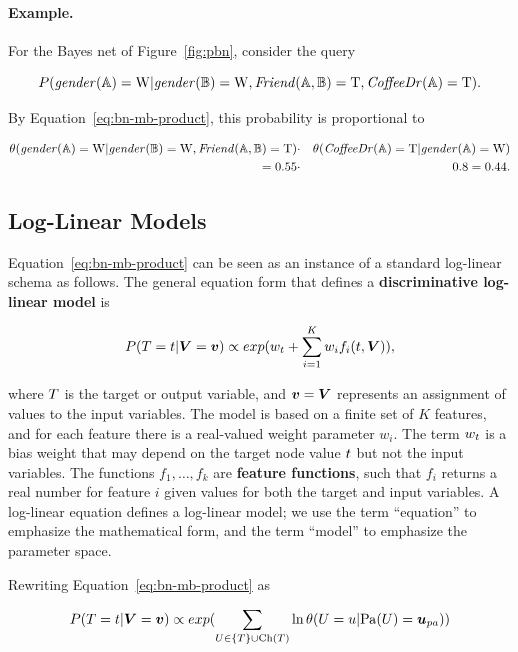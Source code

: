 \documentclass[runningheads,a4paper]{llncs}
\newcommand{\strongpoint}[1]{\paragraph{#1.}}
\begin{document}
\strongpoint{Example} For the Bayes net of Figure~\ref{fig:pbn}, consider the query

$$P(\it{gender}(\mathbb{A}) = \mathrm{W} | \it{gender}(\mathbb{B}) = \mathrm{W}, \it{Friend}(\mathbb{A},\mathbb{B}) = \mathrm{T}, \it{CoffeeDr}(\mathbb{A}) = \mathrm{T}).$$

\noindent By Equation~\ref{eq:bn-mb-product}, this probability is proportional to 

\begin{eqnarray*}
\theta(\it{gender}(\mathbb{A}) = \mathrm{W}|\it{gender}(\mathbb{B}) = \mathrm{W}, \it{Friend}(\mathbb{A},\mathbb{B}) = \mathrm{T}) & \cdot & \theta(\it{CoffeeDr}(\mathbb{A}) = \mathrm{T}|\it{gender}(\mathbb{A}) = \mathrm{W}) \\
= 0.55 &\cdot &0.8 = 0.44.
\end{eqnarray*}


\subsection{Log-Linear Models}

Equation~\ref{eq:bn-mb-product} can be seen as an instance of a standard log-linear schema as follows. The general equation form that defines a \textbf{discriminative log-linear model} \cite[Sec.4.2.2.1]{Sutton2007} is 

\begin{equation} \label{eq:log-linear}
\Gprob{\TT = \TV} {\VF = \VTuple} \propto exp(w_{\TV} + \sum_{i=1}^{K} w_{i} f_{i}(\TV,\VF)),
\end{equation}

\noindent where $T$ is the target or output variable, and $\VTuple = \VF$ represents an assignment of values to the input variables. The model is based on a finite set of $K$ features, and for each feature there is a real-valued weight parameter $w_{i}$. The term $w_{t}$ is a bias weight that may depend on the target node value $t$ but not the input variables. The functions $f_{1},\ldots,f_{k}$ are \textbf{feature functions}, such that $f_{i}$ returns a real number for feature $i$ given values for both the target and input variables. A log-linear equation defines a log-linear model; we use the term ``equation'' to emphasize the mathematical form, and the term ``model'' to emphasize the parameter space.

Rewriting Equation~\ref{eq:bn-mb-product} as 

\begin{equation} \label{eq:bn-mb}
\Gprob{\TT = \TV} {\VF = \VTuple} \propto exp(\sum_{\UT \in \{\TT\} \cup \Ch{\TT}} \ln\cprob{\UT = \UV}{\Pa{\UT} = \Prange{\UT}})
\end{equation}
\end{document}
